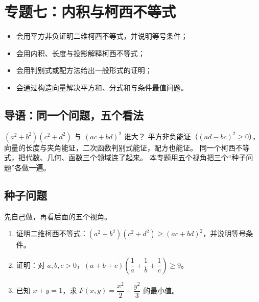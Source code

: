 \section{专题七：内积与柯西不等式}

\begin{learnobjective}
\begin{itemize}
  \item 会用平方非负证明二维柯西不等式，并说明等号条件；
  \item 会用内积、长度与投影解释柯西不等式；
  \item 会用判别式或配方法给出一般形式的证明；
  \item 会通过构造向量解决平方和、分式和与条件最值问题。
\end{itemize}
\end{learnobjective}

\begin{preview}
\subsection{导语：同一个问题，五个看法}
$(a^2+b^2)(c^2+d^2)$ 与 $(ac+bd)^2$ 谁大？
平方非负能证（$(ad-bc)^2\geq0$），向量的长度与夹角能证，二次函数判别式能证，配方也能证。
同一个柯西不等式，把代数、几何、函数三个领域连了起来。
本专题用五个视角把三个“种子问题”各做一遍。

\subsection{种子问题}
先自己做，再看后面的五个视角。
\begin{enumerate}
  \item 证明二维柯西不等式：$(a^2+b^2)(c^2+d^2)\geq(ac+bd)^2$，并说明等号条件。
  \item 证明：对 $a,b,c>0$，$(a+b+c)\left(\dfrac1a+\dfrac1b+\dfrac1c\right)\geq9$。
  \item 已知 $x+y=1$，求 $F(x,y)=\dfrac{x^2}{2}+\dfrac{y^2}{3}$ 的最小值。
\end{enumerate}
\end{preview}

